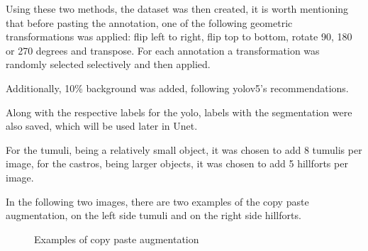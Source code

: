 Using these two methods, the dataset was then created, it is worth mentioning that before pasting the annotation, one of the following geometric transformations was applied: flip left to right, flip top to bottom, rotate 90, 180 or 270 degrees and transpose. For each annotation a transformation was randomly selected selectively and then applied.

Additionally, 10\% background was added, following yolov5's recommendations.

Along with the respective labels for the yolo, labels with the segmentation were also saved, which will be used later in Unet.

For the tumuli, being a relatively small object, it was chosen to add 8 tumulis per image, for the castros, being larger objects, it was chosen to add 5 hillforts per image.

In the following two images, there are two examples of the copy paste augmentation, on the left side tumuli and on the right side hillforts.
\begin{figure}[H]
    \centering
    \qquad
    \caption{Examples of copy paste augmentation}%
\end{figure}

